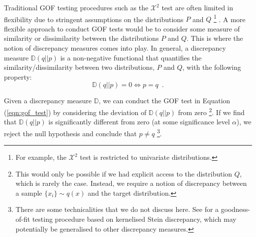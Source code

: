 Traditional GOF testing procedures such as the $\mathcal{X}^2$ test are often limited in flexibility due to stringent assumptions on the distributions $P$ and $Q$ \footnote{For example, the $\mathcal{X}^2$ test is restricted to univariate distributions.} \citep[see,][chap. 9]{rice_textbook}. A more flexible approach to conduct GOF tests would be to consider some measure of similarity or dissimilarity between the distributions $P$ and $Q$. This is where the notion of discrepancy measures comes into play. In general, a discrepancy measure $\mathbb{D}(q || p)$ is a non-negative functional that quantifies the similarity/dissimilarity between two distributions, $P$ and $Q$, with the following property:
\renewcommand{\theequation}{2.7}
\begin{equation}
\mathbb{D}(q||p) = 0 \iff p = q \enspace.
\end{equation}


Given a discrepancy measure $\mathbb{D}$, we can conduct the GOF test in Equation (\ref{eqn:gof_test}) by considering the deviation of $\mathbb{D}(q||p)$ from zero \footnote{This would only be possible if we had explicit access to the distribution $Q$, which is rarely the case. Instead, we require a notion of discrepancy between a sample $\{x_i\} \sim q(x)$ and the target distribution.}. If we find that $\mathbb{D}(q||p)$ is significantly different from zero (at some significance level $\alpha$), we reject the null hypothesis and conclude that $p \not=q$ \footnote{There are some technicalities that we do not discuss here. See \citet{liu_ksd} for a goodness-of-fit testing procedure based on kernelised Stein discrepancy, which may potentially be generalised to other discrepancy measures.}.

